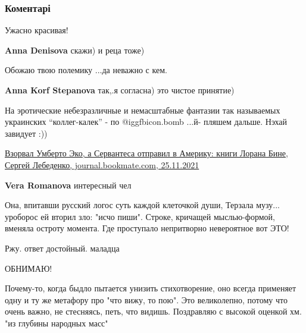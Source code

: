  
 
 
 
 
\subsubsection{Коментарі}
\label{sec:27_11_2021.fb.bilchenko_evgenia.1.obo_mne_prekrasno.cmt}

\begin{itemize} %
Ужасно красивая!


\textbf{Anna Denisova} скажи) и реца тоже)

Обожаю твою полемику ...да неважно с кем.

\textbf{Anna Korf Stepanova} так,.я согласна) это чистое принятие)


На эротические небезразличные и немасштабные фантазии так называемых украинских
\enquote{коллег-калек} - по @igg{fbicon.bomb} ...й- пляшем дальше. Нэхай завидует :))

\href{https://journal.bookmate.com/vzorval-umberto-eko-otpravil-servantesa-v-ameriku-jizn-i-knigi-lorana-bine/}{%
Взорвал Умберто Эко, а Сервантеса отправил в Америку: книги Лорана Бине, Сергей Лебеденко, %
journal.bookmate.com, 25.11.2021%
}

\textbf{Vera Romanova} интересный чел


\obeycr
Она, впитавши русский логос
суть каждой клеточкой души,
Терзала музу... уроборос
ей вторил зло: "исчо пиши".
Строке, кричащей мыслью-формой,
вменяла остроту момента.
Где проступало непритворно
невероятное вот ЭТО!
\restorecr

Ржу. ответ достойный. маладца

ОБНИМАЮ!


Почему-то, когда быдло пытается унизить стихотворение, оно всегда применяет
одну и ту же метафору про "что вижу, то пою".  Это великолепно, потому что
очень важно, не стесняясь, петь, что видишь. Поздравляю с высокой оценкой хм.
"из глубины народных масс"

\end{itemize} %

